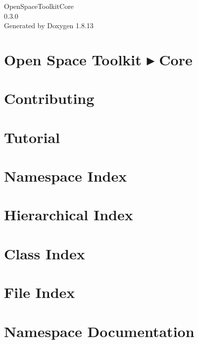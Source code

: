 \documentclass[twoside]{book}
\newcommand{\+}{\discretionary{\mbox{\scriptsize$\hookleftarrow$}}{}{}}
\newcommand{\clearemptydoublepage}{%
  \newpage{\pagestyle{empty}\cleardoublepage}%
}
\begin{document}
\hypersetup{pageanchor=false,
             bookmarksnumbered=true,
             pdfencoding=unicode
            }
\begin{titlepage}
\vspace*{7cm}
\begin{center}%
{\Large Open\+Space\+Toolkit\+Core \\[1ex]\large 0.\+3.\+0 }\\
\vspace*{1cm}
{\large Generated by Doxygen 1.8.13}\\
\end{center}
\end{titlepage}
\clearemptydoublepage
{}
\tableofcontents
\clearemptydoublepage
{}
\hypersetup{pageanchor=true}

\chapter{Open Space Toolkit ▸ Core}
\label{index}\hypertarget{index}{}
\chapter{Contributing}
\label{md__c_o_n_t_r_i_b_u_t_i_n_g}

\chapter{Tutorial}
\label{md_docs__tutorial}

\chapter{Namespace Index}

\chapter{Hierarchical Index}

\chapter{Class Index}

\chapter{File Index}

\chapter{Namespace Documentation}














\end{document}
